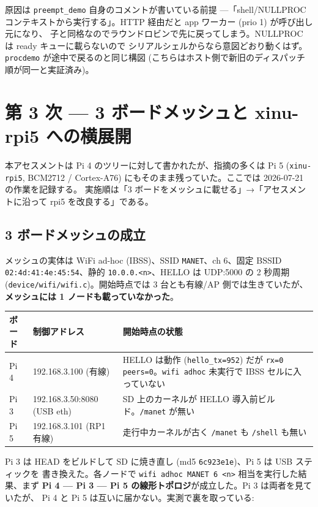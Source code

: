 \documentclass[a4paper,11pt]{ltjsarticle}
\begin{document}
原因は \texttt{preempt\_demo} 自身のコメントが書いている前提 ---「shell/NULLPROC
コンテキストから実行する」。HTTP 経由だと app ワーカー (prio 1) が呼び出し元になり、
子と同格なのでラウンドロビンで先に戻ってしまう。NULLPROC は ready キューに載らないので
シリアルシェルからなら意図どおり動くはず。\texttt{procdemo} が途中で戻るのと同じ構図
(こちらはホスト側で新旧のディスパッチ順が同一と実証済み)。

\section{第 3 次 --- 3 ボードメッシュと xinu-rpi5 への横展開}

本アセスメントは Pi 4 のツリーに対して書かれたが、指摘の多くは Pi 5 (\texttt{xinu-rpi5},
BCM2712 / Cortex-A76) にもそのまま残っていた。ここでは 2026-07-21 の作業を記録する。
実施順は「3 ボードをメッシュに載せる」→「アセスメントに沿って rpi5 を改良する」である。

\subsection{3 ボードメッシュの成立}

メッシュの実体は WiFi ad-hoc (IBSS)、SSID \texttt{MANET}、ch 6、固定 BSSID
\texttt{02:4d:41:4e:45:54}、静的 \texttt{10.0.0.<n>}、HELLO は UDP:5000 の 2 秒周期
(\texttt{device/wifi/wifi.c})。開始時点では 3 台とも有線/AP 側では生きていたが、
\textbf{メッシュには 1 ノードも載っていなかった}。

\begin{center}\small
\begin{longtable}{@{}l l p{7.4cm}@{}}
\toprule
\textbf{ボード} & \textbf{制御アドレス} & \textbf{開始時点の状態}\\ \midrule
\endhead
Pi 4 & 192.168.3.100 (有線)      & HELLO は動作 (\texttt{hello\_tx=952}) だが \texttt{rx=0 peers=0}。\texttt{wifi adhoc} 未実行で IBSS セルに入っていない\\
Pi 3 & 192.168.3.50:8080 (USB eth) & SD 上のカーネルが HELLO 導入前ビルド。\texttt{/manet} が無い\\
Pi 5 & 192.168.3.101 (RP1 有線)  & 走行中カーネルが古く \texttt{/manet} も \texttt{/shell} も無い\\
\bottomrule
\end{longtable}
\end{center}

Pi 3 は HEAD をビルドして SD に焼き直し (md5 \texttt{6c923e1e})、Pi 5 は USB スティックを
書き換えた。各ノードで \texttt{wifi adhoc MANET 6 <n>} 相当を実行した結果、まず
\textbf{Pi 4 --- Pi 3 --- Pi 5 の線形トポロジ}が成立した。Pi 3 は両者を見ていたが、
Pi 4 と Pi 5 は互いに届かない。実測で裏を取っている:
\end{document}
